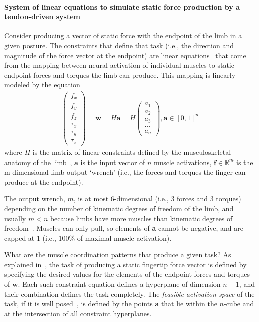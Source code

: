 \documentclass[letterpaper]{article}
\begin{document}
\paragraph*{System of linear equations to simulate static force production by a tendon-driven system}

Consider producing a vector of static force with the endpoint of the limb in a given posture. The constraints that define that task (i.e., the direction and magnitude of the force vector at the endpoint) are linear equations~\cite{valero-cuevas2015fundamentals} that come from the mapping between neural activation of individual muscles to static endpoint forces and torques the limb can produce. This mapping is linearly modeled by the equation
\begin{align}
\label{eq:constraints}
		 \begin{pmatrix}
f_{x}\\
f_{y}\\
f_{z}\\
\tau_{x}\\
\tau_{y}\\
\tau_{z}
\end{pmatrix}=\textbf{w} = H\textbf{a} = H\begin{pmatrix}
a_{1}\\
a_{2}\\
a_{3}\\
...\\
a_{n}
\end{pmatrix}
, \textbf{a} \in [0,1]^n
\end{align}
where $H$ is the matrix of linear constraints defined by the musculoskeletal anatomy of the limb~\cite{Valero-Cuevas2015high-dimensional}, \textbf{a} is the input vector of $n$ muscle activations, $\textbf{f} \in \mathbb{R}^m$ is the m-dimensional limb output `wrench' (i.e., the forces and torques the finger can produce at the endpoint).

The output wrench, $m$, is at most 6-dimensional (i.e., 3 forces and 3 torques) depending on the number of kinematic degrees of freedom of the limb, and usually $m < n$ because limbs have more muscles than kinematic degrees of freedom~\cite{valero-cuevas2015fundamentals}. Muscles can only pull, so elements of \textbf{a} cannot be negative, and are capped at 1 (i.e., 100\% of maximal muscle activation).

What are the muscle coordination patterns that produce a given task? As explained in~\cite{valero-cuevas2015fundamentals}, the task of producing a static fingertip force vector is defined by specifying the desired values for the elements of the endpoint forces and torques of $\textbf{w}$. Each such constraint equation defines a hyperplane of dimension $n-1$, and their combination defines the task completely. The \emph{feasible activation space} of the task, if it is well posed~\cite{chvatal1983linear}, is defined by the points $\textbf{a}$ that lie within the $n$-cube and at the intersection of all constraint hyperplanes.
\end{document}
